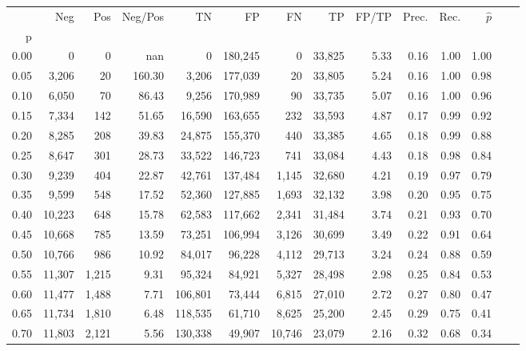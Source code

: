 \begin{tabular}{rrrrrrrrrrrrrr}
\toprule
{} &     Neg &    Pos & Neg/Pos &       TN &       FP &      FN &      TP & FP/TP & Prec. &  Rec. & $\hat{p}$ \\
p    &         &        &         &          &          &         &         &       &       &       &           \\
\midrule
0.00 &       0 &      0 &     nan &        0 &  180,245 &       0 &  33,825 &  5.33 &  0.16 &  1.00 &      1.00 \\
0.05 &   3,206 &     20 &  160.30 &    3,206 &  177,039 &      20 &  33,805 &  5.24 &  0.16 &  1.00 &      0.98 \\
0.10 &   6,050 &     70 &   86.43 &    9,256 &  170,989 &      90 &  33,735 &  5.07 &  0.16 &  1.00 &      0.96 \\
0.15 &   7,334 &    142 &   51.65 &   16,590 &  163,655 &     232 &  33,593 &  4.87 &  0.17 &  0.99 &      0.92 \\
0.20 &   8,285 &    208 &   39.83 &   24,875 &  155,370 &     440 &  33,385 &  4.65 &  0.18 &  0.99 &      0.88 \\
0.25 &   8,647 &    301 &   28.73 &   33,522 &  146,723 &     741 &  33,084 &  4.43 &  0.18 &  0.98 &      0.84 \\
0.30 &   9,239 &    404 &   22.87 &   42,761 &  137,484 &   1,145 &  32,680 &  4.21 &  0.19 &  0.97 &      0.79 \\
0.35 &   9,599 &    548 &   17.52 &   52,360 &  127,885 &   1,693 &  32,132 &  3.98 &  0.20 &  0.95 &      0.75 \\
0.40 &  10,223 &    648 &   15.78 &   62,583 &  117,662 &   2,341 &  31,484 &  3.74 &  0.21 &  0.93 &      0.70 \\
0.45 &  10,668 &    785 &   13.59 &   73,251 &  106,994 &   3,126 &  30,699 &  3.49 &  0.22 &  0.91 &      0.64 \\
0.50 &  10,766 &    986 &   10.92 &   84,017 &   96,228 &   4,112 &  29,713 &  3.24 &  0.24 &  0.88 &      0.59 \\
0.55 &  11,307 &  1,215 &    9.31 &   95,324 &   84,921 &   5,327 &  28,498 &  2.98 &  0.25 &  0.84 &      0.53 \\
0.60 &  11,477 &  1,488 &    7.71 &  106,801 &   73,444 &   6,815 &  27,010 &  2.72 &  0.27 &  0.80 &      0.47 \\
0.65 &  11,734 &  1,810 &    6.48 &  118,535 &   61,710 &   8,625 &  25,200 &  2.45 &  0.29 &  0.75 &      0.41 \\
0.70 &  11,803 &  2,121 &    5.56 &  130,338 &   49,907 &  10,746 &  23,079 &  2.16 &  0.32 &  0.68 &      0.34 \\

\end{tabular}
